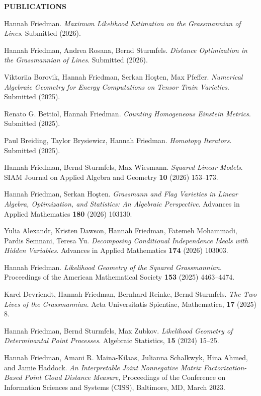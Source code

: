 \documentclass[11pt]{article}
\newcommand{\hdr}[1]{\textcolor{blue(ryb)}{\textbf{#1}}}
\begin{document}
\hdr{PUBLICATIONS}\\
\begin{etaremune}
\item Hannah Friedman.
  \emph{Maximum Likelihood Estimation on the Grassmannian of Lines}. Submitted (2026).
\item Hannah Friedman, Andrea Rosana, Bernd Sturmfels.
  \emph{Distance Optimization in the Grassmannian of Lines}. Submitted (2026). 
\item Viktoriia Borovik, Hannah Friedman, Serkan Ho\c{s}ten, Max Pfeffer.
  \emph{Numerical Algebraic Geometry for Energy Computations on Tensor Train Varieties}.
  Submitted (2025). 
\item Renato G. Bettiol, Hannah Friedman.
  \emph{Counting Homogeneous Einstein Metrics}.
  Submitted (2025).
\item Paul Breiding, Taylor Brysiewicz, Hannah Friedman.
  \emph{Homotopy Iterators}.
  Submitted (2025). 
\item Hannah Friedman, Bernd Sturmfels, Max Wiesmann.
  \emph{Squared Linear Models}.
  SIAM Journal on Applied Algebra and Geometry
  {\bf 10} (2026) 153--173. 
\item Hannah Friedman, Serkan Ho\c{s}ten.
  \textit{Grassmann and Flag Varieties in Linear Algebra, Optimization, and Statistics: An Algebraic Perspective}.
  Advances in Applied Mathematics
  {\bf 180} (2026) 103130. 
\item Yulia Alexandr, Kristen Dawson, Hannah Friedman, Fatemeh Mohammadi, Pardis Semnani, Teresa Yu.
  \emph{Decomposing Conditional Independence Ideals with Hidden Variables}.
  Advances in Applied Mathematics
  {\bf 174} (2026) 103003.
\item Hannah Friedman.
  \emph{Likelihood Geometry of the Squared Grassmannian}.
  Proceedings of the American Mathematical Society \textbf{153} (2025) 4463--4474.
  \item Karel Devriendt, Hannah Friedman, Bernhard Reinke, Bernd Sturmfels.
    \emph{The Two Lives of the Grassmannian}.
    Acta Universitatis Spientiae, Mathematica, \textbf{17} (2025) 8. 
\item Hannah Friedman, Bernd Sturmfels, Max Zubkov.
  \emph{Likelihood Geometry of Determinantal Point Processes}.
  Algebraic Statistics, \textbf{15} (2024) 15--25.
\item Hannah Friedman, Amani R. Maina-Kilaas, Julianna Schalkwyk, Hina Ahmed, and Jamie Haddock. 
  \emph{An Interpretable Joint Nonnegative Matrix Factorization-Based Point Cloud Distance Measure}, Proceedings of the Conference on Information Sciences and Systems (CISS), Baltimore, MD, March 2023.
\end{etaremune}
\end{document}
